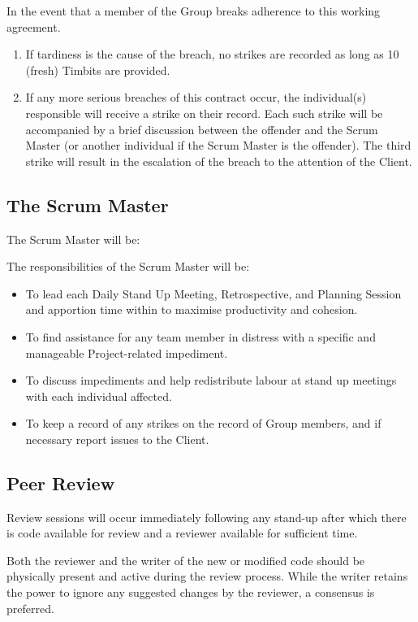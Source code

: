 \documentclass[a4paper,12pt]{article} %
\begin{document}
In the event that a member of the Group breaks adherence to this working agreement. 
\begin{enumerate}
	\item If tardiness is the cause of the breach, no strikes are recorded as long as 10 (fresh) Timbits are provided.
	\item If any more serious breaches of this contract occur, the individual(s) responsible will receive a strike on their record. Each such strike will be accompanied by a brief discussion between the offender and the Scrum Master (or another individual if the Scrum Master is the offender). The third strike will result in the escalation of the breach to the attention of the Client.
\end{enumerate}

\subsection{The Scrum Master}
The Scrum Master will be: 

The responsibilities of the Scrum Master will be:
\begin{itemize}
\item To lead each Daily Stand Up Meeting, Retrospective, and Planning Session and apportion time within to maximise productivity and cohesion.

\item To find assistance for any team member in distress with a specific and manageable Project-related impediment.

\item To discuss impediments and help redistribute labour at stand up meetings with each individual affected.

\item To keep a record of any strikes on the record of Group members, and if necessary report issues to the Client.
\end{itemize}

\subsection{Peer Review}
Review sessions will occur immediately following any stand-up after which there is code available for review and a reviewer available for sufficient time.

Both the reviewer and the writer of the new or modified code should be physically present and active during the review process. While the writer retains the power to ignore any suggested changes by the reviewer, a consensus is preferred.
\end{document}
